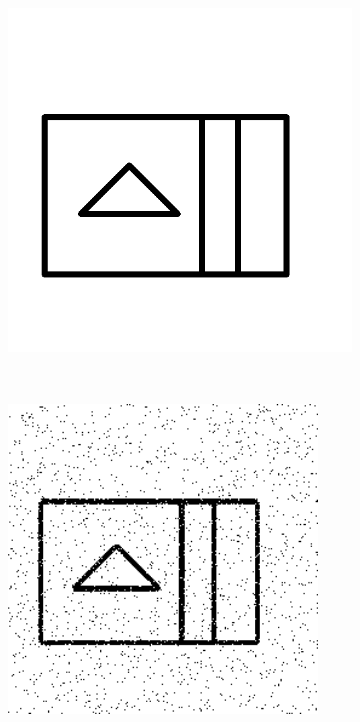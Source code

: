     \begin{figure}[h]
        \centering
                \begin{subfigure}[b]{0.2\textwidth}
                \centering
                \includegraphics[width=1.1\textwidth]{figures/Results/NoiseE/Model.png}
                \caption{}
        \end{subfigure}\\
                \begin{subfigure}[b]{0.25\textwidth}
                \centering
                \includegraphics[width=0.9\textwidth]{figures/Results/NoiseE/1.png}

\end{subfigure}
\end{figure}
